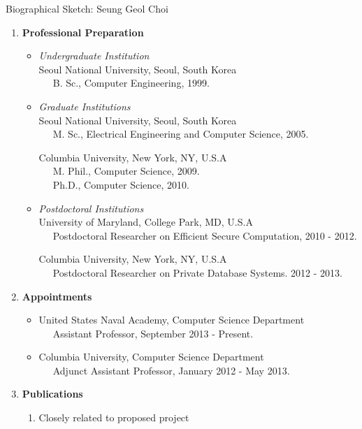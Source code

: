 \documentclass[11pt]{article}
\def\BI{\begin{itemize}}
\def\EI{\end{itemize}}
\begin{document}
\begin{center}
{\LARGE Biographical Sketch: Seung Geol Choi}
\end{center}


\begin{enumerate}[label=\textbf{(\alph*)}]

\item \textbf{Professional Preparation}
\BI
\item {\it Undergraduate Institution} \\
Seoul National University, Seoul, South Korea\\ 
$~~~~~$ B. Sc., Computer Engineering, 1999. 

\item {\it Graduate Institutions} \\
Seoul National University, Seoul, South Korea\\ 
$~~~~~$ M. Sc., Electrical Engineering and Computer Science, 2005. 

Columbia University, New York, NY, U.S.A\\
$~~~~~$ M. Phil., Computer Science, 2009. \\
$~~~~~$ Ph.D., Computer Science, 2010. 

\item {\it Postdoctoral Institutions} \\
University of Maryland, College Park, MD, U.S.A \\ 
$~~~~~$ Postdoctoral Researcher on Efficient Secure Computation, 2010 - 2012.

Columbia University, New York, NY, U.S.A\\
$~~~~~$ Postdoctoral Researcher on Private Database Systems. 2012 - 2013. 
\EI


\item \textbf{Appointments}
\BI
\item United States Naval Academy, Computer Science Department \\
$~~~~~$ Assistant Professor, September 2013 - Present.

\item Columbia University, Computer Science Department \\ 
$~~~~~$ Adjunct Assistant Professor, January 2012 - May 2013. \\
\EI


\item {\bf Publications}
\begin{enumerate}[label=(\roman*)]
\item Closely related to proposed project
\begin{enumerate}[label=\arabic*.]


\end{enumerate}
\end{enumerate}
\end{enumerate}
\end{document}
